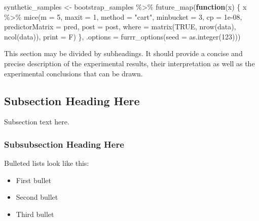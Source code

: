 \documentclass[psych,article,submit,moreauthors,pdftex]{mdpi}
\providecommand{\tightlist}{%
  \setlength{\itemsep}{0pt}\setlength{\parskip}{4pt}}
\newenvironment{Shaded}{\begin{snugshade}}{\end{snugshade}}
\newcommand{\AttributeTok}[1]{\textcolor[rgb]{0.77,0.63,0.00}{#1}}
\newcommand{\ConstantTok}[1]{\textcolor[rgb]{0.00,0.00,0.00}{#1}}
\newcommand{\ControlFlowTok}[1]{\textcolor[rgb]{0.13,0.29,0.53}{\textbf{#1}}}
\newcommand{\DecValTok}[1]{\textcolor[rgb]{0.00,0.00,0.81}{#1}}
\newcommand{\FloatTok}[1]{\textcolor[rgb]{0.00,0.00,0.81}{#1}}
\newcommand{\FunctionTok}[1]{\textcolor[rgb]{0.00,0.00,0.00}{#1}}
\newcommand{\NormalTok}[1]{#1}
\newcommand{\OtherTok}[1]{\textcolor[rgb]{0.56,0.35,0.01}{#1}}
\newcommand{\SpecialCharTok}[1]{\textcolor[rgb]{0.00,0.00,0.00}{#1}}
\newcommand{\StringTok}[1]{\textcolor[rgb]{0.31,0.60,0.02}{#1}}
\begin{document}
\begin{Shaded}
\begin{Highlighting}[]
\NormalTok{synthetic\_samples }\OtherTok{\textless{}{-}} 
\NormalTok{  bootstrap\_samples }\SpecialCharTok{\%\textgreater{}\%}
  \FunctionTok{future\_map}\NormalTok{(}\ControlFlowTok{function}\NormalTok{(x) \{}
\NormalTok{    x }\SpecialCharTok{\%\textgreater{}\%} \FunctionTok{mice}\NormalTok{(}\AttributeTok{m =} \DecValTok{5}\NormalTok{, }
               \AttributeTok{maxit =} \DecValTok{1}\NormalTok{,}
               \AttributeTok{method =} \StringTok{"cart"}\NormalTok{,}
               \AttributeTok{minbucket =} \DecValTok{3}\NormalTok{,}
               \AttributeTok{cp =} \FloatTok{1e{-}08}\NormalTok{,}
               \AttributeTok{predictorMatrix =}\NormalTok{ pred,}
               \AttributeTok{post =}\NormalTok{ post,}
               \AttributeTok{where =} \FunctionTok{matrix}\NormalTok{(}\ConstantTok{TRUE}\NormalTok{, }\FunctionTok{nrow}\NormalTok{(data), }\FunctionTok{ncol}\NormalTok{(data)),}
               \AttributeTok{print =}\NormalTok{ F)}
\NormalTok{\}, }\AttributeTok{.options =} \FunctionTok{furrr\_options}\NormalTok{(}\AttributeTok{seed =} \FunctionTok{as.integer}\NormalTok{(}\DecValTok{123}\NormalTok{)))}
\end{Highlighting}
\end{Shaded}

This section may be divided by subheadings. It should provide a concise
and precise description of the experimental results, their
interpretation as well as the experimental conclusions that can be
drawn.

\hypertarget{subsection-heading-here}{%
\subsection{Subsection Heading Here}\label{subsection-heading-here}}

Subsection text here.

\hypertarget{subsubsection-heading-here}{%
\subsubsection{Subsubsection Heading
Here}\label{subsubsection-heading-here}}

Bulleted lists look like this:

\begin{itemize}
\tightlist
\item
  First bullet
\item
  Second bullet
\item
  Third bullet
\end{itemize}
\end{document}
